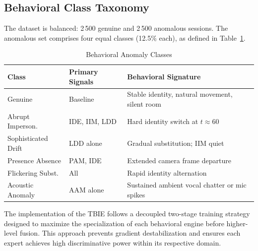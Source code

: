 \documentclass[journal]{IEEEtran}
\begin{document}
\subsection{Behavioral Class Taxonomy}

The dataset is balanced: 2\,500 genuine and 2\,500 anomalous sessions. The anomalous set comprises four equal classes (12.5\% each), as defined in Table~\ref{tab:classes}.

\begin{table}[!ht]
\caption{Behavioral Anomaly Classes}
\label{tab:classes}
\centering
\footnotesize
\begin{tabular}{@{}llp{3.5cm}@{}}
\toprule
\textbf{Class} & \textbf{Primary Signals} & \textbf{Behavioral Signature} \\
\midrule
Genuine & Baseline & Stable identity, natural movement, silent room \\
Abrupt Imperson. & IDE, IIM, LDD & Hard identity switch at $t{\approx}60$ \\
Sophisticated Drift & LDD alone & Gradual substitution; IIM quiet \\
Presence Absence & PAM, IDE & Extended camera frame departure \\
Flickering Subst. & All & Rapid identity alternation \\
Acoustic Anomaly & AAM alone & Sustained ambient vocal chatter or mic spikes \\
\bottomrule
\end{tabular}
\end{table}

The implementation of the TBIE follows a decoupled two-stage training strategy designed to maximize the specialization of each behavioral engine before higher-level fusion. This approach prevents gradient destabilization and ensures each expert achieves high discriminative power within its respective domain.
\end{document}
